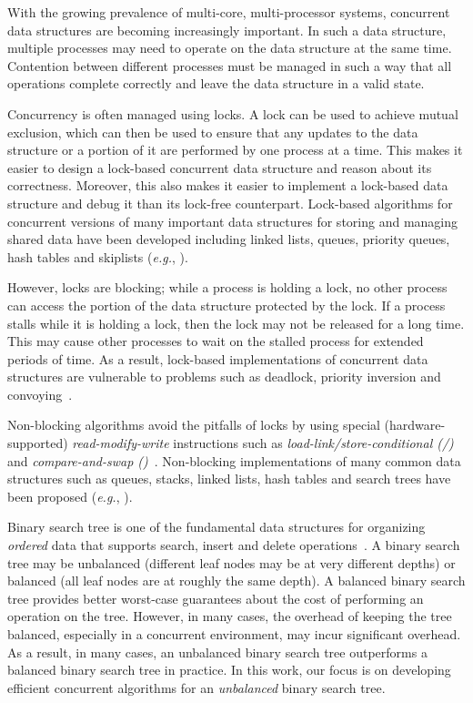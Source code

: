 With the growing prevalence of multi-core, multi-processor systems, concurrent data structures are becoming increasingly important. In such a data structure, multiple processes may need to operate on the data structure at the same time. Contention between different processes must be managed in such a way that all operations complete correctly and leave the data structure in a valid state.

Concurrency is often managed using locks. A lock can be used to achieve mutual exclusion, which can then be used to ensure that any updates to the data structure or a portion of it are performed by one process at a time. This makes it easier to design a lock-based concurrent data structure and reason about its correctness. Moreover, this also makes it easier to implement a lock-based data structure and debug it than its lock-free counterpart. Lock-based algorithms for concurrent versions of many important data structures for storing and managing shared data have been developed including linked lists, queues, priority queues, hash tables and skiplists (\emph{e.g.}, \cite{MicSco:1996:PODC, Mic:2002:SPAA,Lea:2003:JSR166,HelHer+:2005:OPODIS,LevHer+:2007:SIROCCO, HerSha:2012:Book}).

However, locks are blocking; while a process is holding a lock, no other process can access the portion of the data structure protected by the lock. If a process stalls while it is holding a lock, then the lock may not be released for a long time. This may cause other processes to wait on the stalled process for extended periods of time. As a result, lock-based implementations of concurrent data structures are vulnerable to problems such as deadlock, priority inversion and convoying~\cite{HerSha:2012:Book}.

Non-blocking algorithms avoid the pitfalls of locks by using special (hardware-supported) \emph{read-modify-write} instructions such as \emph{load-link/store-conditional (\LL{}/\SC{})}  and \linebreak \emph{compare-and-swap (\CAS{})}~\cite{HerSha:2012:Book}. Non-blocking implementations of many common data structures such as queues, stacks, linked lists, hash tables and search trees  have been proposed (\emph{e.g.}, \cite{Mic:2002:SPAA,FomRup:2004:PODC,BenFin+:2005:SPAA,EllFat+:2010:PODC,HerSha:2012:Book,BraPet:2012:SPAA,HowJon:2012:SPAA,NatMit:2013:DISC,NatSav+:2013:SSS,NatMit:2014:PPoPP,DraVec+:2014:PPoPP,EllFat+:2014:PODC}).

Binary search tree is one of the fundamental data structures for organizing \emph{ordered} data that supports search, insert and delete operations~\cite{CorLei+:1991:MIT}. A binary search tree may be unbalanced (different leaf nodes may be at very different depths) or balanced (all leaf nodes are at roughly the same depth). A balanced binary search tree provides better worst-case guarantees about the cost of performing an operation on the tree. However, in many cases, the overhead of keeping the tree balanced, especially in a concurrent environment, may incur significant overhead. As a result, in many cases, an unbalanced binary search tree  outperforms a balanced binary search tree in practice. In this work, our focus is on developing efficient concurrent algorithms for an \emph{unbalanced} binary search tree. 

